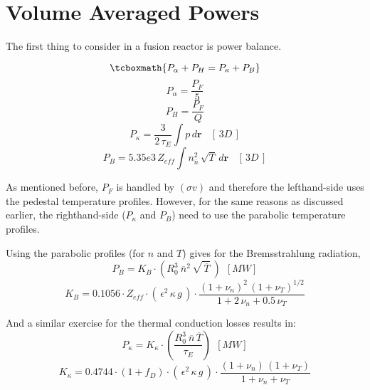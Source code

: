 \section{Volume Averaged Powers}

The first thing to consider in a fusion reactor is power balance. 

\label{pwr_bal}
\begin{equation}
\tcboxmath{
P_\alpha + P_H = P_\kappa + P_B }
\end{equation}
\begin{equation}
	P_\alpha = \frac{P_F}{5}
\end{equation}
\begin{equation}
	P_H = \frac{P_F}{Q}
\end{equation}
\begin{equation}
	P_\kappa = \frac{3}{2 \, \tau_E} \int p \, d\textbf{r} \ \ \ \ [ \, 3D \, ]
\end{equation}
\begin{equation}
	P_B = 5.35e3 \, Z_{eff} \int n_{\overline{n}}^2 \, \sqrt{T} \, d\textbf{r} \ \ \ \ [ \, 3D \, ]
\end{equation}

As mentioned before, $P_F$ is handled by $(\sigma v)$ and therefore the lefthand-side uses the pedestal temperature profiles. However, for the same reasons as discussed earlier, the righthand-side ($P_\kappa$ and $P_B$) need to use the parabolic temperature profiles.

Using the parabolic profiles (for $n$ and $T$) gives for the Bremsstrahlung radiation,
\begin{equation}
	P_B = K_B \cdot \left( R_0^3 \ \overline{n}^2 \, \sqrt{\,\overline{T}} \ \right) \ \ [MW]
\end{equation}
\begin{equation}
	K_B = 0.1056 \cdot Z_{eff} \cdot ( \, \epsilon^2 \, \kappa \, g \, ) \cdot \frac{ (1+\nu_n)^2 \, (1+\nu_T)^{1/2} }{1+2 \, \nu_n + 0.5 \, \nu_T}
\end{equation}

And a similar exercise for the thermal conduction losses results in:
\begin{equation}
	P_\kappa = K_\kappa \cdot \left( \frac{ R_0 ^ 3 \ \overline{n}  \, \overline{T} }{\tau_E} \right) \ \ [MW]
\end{equation}
\begin{equation}
	K_\kappa = 0.4744 \cdot  ( 1 + f_D ) \cdot ( \, \epsilon^2 \, \kappa \, g \, ) \cdot \frac{ (1 + \nu_n) \, (1 + \nu_T) }{1 + \nu_n + \nu_T }
\end{equation}

\clearpage
\newpage





